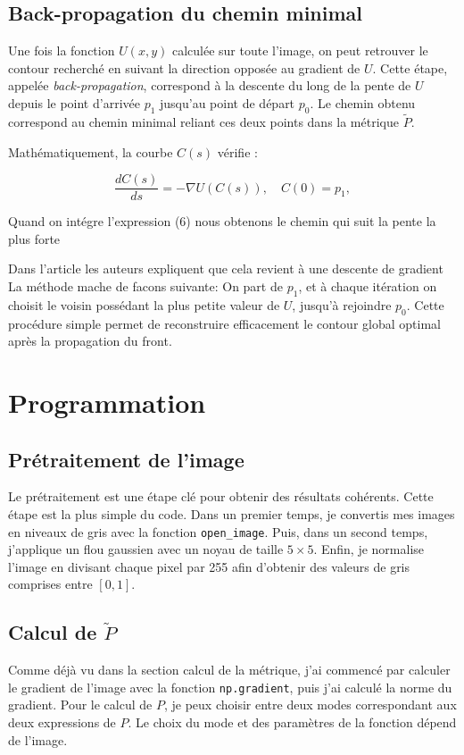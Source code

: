 \documentclass{article}
\begin{document}
\subsection{Back-propagation du chemin minimal}


Une fois la fonction $U(x,y)$ calculée sur toute l’image, 
on peut retrouver le contour recherché en suivant la direction opposée au gradient de $U$.
Cette étape, appelée \textit{back-propagation}, correspond à la descente du long de la pente de $U$
depuis le point d’arrivée $p_1$ jusqu’au point de départ $p_0$.
Le chemin obtenu correspond au chemin minimal reliant ces deux points 
dans la métrique $\tilde{P}$.

Mathématiquement, la courbe $C(s)$ vérifie :

\begin{equation}
\frac{dC(s)}{ds} = -\nabla U(C(s)), \quad C(0) = p_1,
\end{equation}

Quand on intégre l'expression (6) nous obtenons le chemin qui suit la pente la plus forte

Dans l'article les auteurs expliquent que cela revient à une descente de gradient
La méthode mache de facons suivante: On part de  $p_1$, et à chaque itération on choisit
le voisin possédant la plus petite valeur de $U$, jusqu’à rejoindre $p_0$.
Cette procédure simple permet de reconstruire efficacement le contour global optimal
après la propagation du front.







\newpage
\section{Programmation}
\subsection{Prétraitement de l'image}

Le prétraitement est une étape clé pour obtenir des résultats cohérents.
Cette étape est la plus simple du code. Dans un premier temps, je convertis mes images en
niveaux de gris avec la fonction \texttt{open\_image}. Puis, dans un second temps, j'applique un flou 
gaussien avec un noyau de taille $5 \times 5$. Enfin, je normalise l'image en divisant
chaque pixel par 255 afin d'obtenir des valeurs de gris comprises entre $[0,1]$.


\subsection{Calcul de $\tilde{P}$}
Comme déjà vu dans la section calcul de la métrique, j'ai commencé par calculer le gradient
de l'image avec la fonction \texttt{np.gradient}, puis j'ai calculé la norme du gradient.
Pour le calcul de $P$, je peux choisir entre deux modes correspondant aux deux expressions de
$P$. Le choix du mode et des paramètres de la fonction dépend de l'image.
\end{document}
